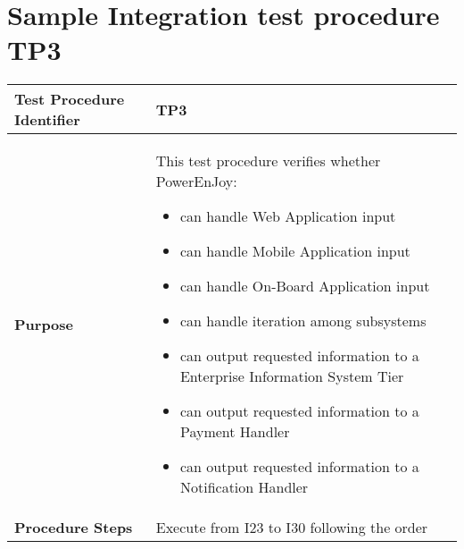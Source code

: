 \section{Sample Integration test procedure TP3} \label{TP2}
\begin{center}
	\vspace{0.6cm}
	\begin{tabular}{|l|p{9cm}|}
		\hline
		\textbf{Test Procedure Identifier} & TP3 \bigstrut \\\hline
		\textbf{Purpose} 
		& This test procedure verifies whether PowerEnJoy: 
		\begin{itemize} 
			\item can handle Web Application input
			\item can handle Mobile Application input
			\item can handle On-Board Application input
			\item can handle iteration among subsystems 
			\item can output requested information to a Enterprise Information System Tier
			\item can output requested information to a Payment Handler
			\item can output requested information to a Notification Handler
		\end{itemize} \bigstrut \\\hline
		\textbf{Procedure Steps} & Execute from I23 to I30 following the order \bigstrut \\\hline
	\end{tabular}
\end{center}